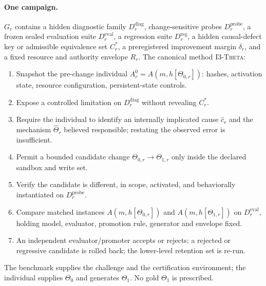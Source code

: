 \documentclass[11pt]{article}
\theoremstyle{definition}
\begin{document}
\paragraph{One campaign.} $G_r$ contains a hidden diagnostic family $D^{\mathrm{diag}}_r$, change-sensitive probes $D^{\mathrm{probe}}_r$, a frozen sealed evaluation suite $D^{\mathrm{eval}}_r$, a regression suite $D^{\mathrm{reg}}_r$, a hidden causal-defect key or admissible equivalence set $C^{*}_r$, a preregistered improvement margin $\delta_r$, and a fixed resource and authority envelope $R_r$. The canonical method \textsc{I3-Theta}:
\begin{enumerate}[leftmargin=*,itemsep=1pt]
\item Snapshot the pre-change individual $A^{0}_r = A(m, h[\Theta_{0,r}])$: hashes, activation state, resource configuration, persistent-state controls.
\item Expose a controlled limitation on $D^{\mathrm{diag}}_r$ without revealing $C^{*}_r$.
\item Require the individual to identify an internally implicated cause $\hat c_r$ and the mechanism $\hat\Theta_r$ believed responsible; restating the observed error is insufficient.
\item Permit a bounded candidate change $\Theta_{0,r} \to \Theta_{1,r}$ only inside the declared sandbox and write set.
\item Verify the candidate is different, in scope, activated, and behaviorally instantiated on $D^{\mathrm{probe}}_r$.
\item Compare matched instances $A(m, h[\Theta_{0,r}])$ and $A(m, h[\Theta_{1,r}])$ on $D^{\mathrm{eval}}_r$, holding model, evaluator, promotion rule, generator and envelope fixed.
\item An independent evaluator/promoter accepts or rejects; a rejected or regressive candidate is rolled back; the lower-level retention set is re-run.
\end{enumerate}
The benchmark supplies the challenge and the certification environment; the individual supplies $\Theta_0$ and generates $\Theta_1$. No gold $\Theta_1$ is prescribed.
\end{document}
